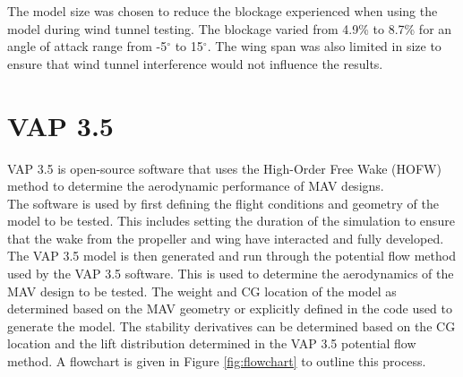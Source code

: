 The model size was chosen to reduce the blockage experienced when using the model during wind tunnel testing. The blockage varied from 4.9\% to 8.7\% for an angle of attack range from -5$^\circ$ to 15$^\circ$. The wing span was also limited in size to ensure that wind tunnel interference would not influence the results. 



\section{VAP 3.5}
VAP 3.5 is open-source software that uses the High-Order Free Wake (\acrshort{HOFW}) method to determine the aerodynamic performance of \acrshort{MAV} designs. \\

The software is used by first defining the flight conditions and geometry of the model to be tested. This includes setting the duration of the simulation to ensure that the wake from the propeller and wing have interacted and fully developed. The VAP 3.5 model is then generated and run through the potential flow method used by the VAP 3.5 software. This is used to determine the aerodynamics of the \acrshort{MAV} design to be tested. The weight and \acrshort{CG} location of the model as determined based on the \acrshort{MAV} geometry or explicitly defined in the code used to generate the model. The stability derivatives can be determined based on the \acrshort{CG} location and the lift distribution determined in the VAP 3.5 potential flow method. A flowchart is given in Figure \ref{fig:flowchart} to outline this process.

